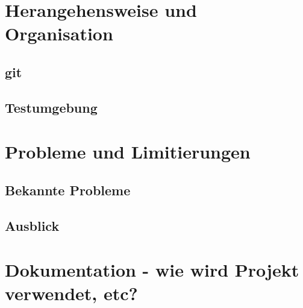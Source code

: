 \documentclass[twoside,twocolumn]{article}
\begin{document}
\section{Herangehensweise und Organisation}
\subsection{git}

\subsection{Testumgebung}

\section{Probleme und Limitierungen}
\subsection{Bekannte Probleme}
\subsection{Ausblick}

\section{Dokumentation - wie wird Projekt verwendet, etc?}



\end{document}
